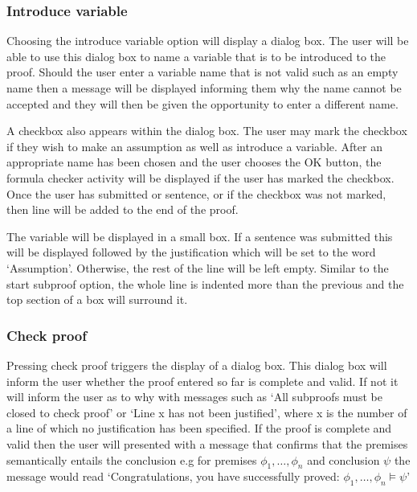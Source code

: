 \subsubsection*{Introduce variable}

Choosing the introduce variable option will display a dialog box. The user will be able to use this dialog box to name a variable that is to be introduced to the proof. Should the user enter a variable name that is not valid such as an empty name then a message will be displayed informing them why the name cannot be accepted and they will then be given the opportunity to enter a different name.


A checkbox also appears within the dialog box. The user may mark the checkbox if they wish to make an assumption as well as introduce a variable. After an appropriate name has been chosen and the user chooses the OK button, the formula checker activity will be displayed  if the user has marked the checkbox. Once the user has submitted or sentence, or if the checkbox was not marked, then line will be added to the end of the proof.

The variable will be displayed in a small box. If a sentence was submitted this will be displayed followed by the justification which will be set to the word `Assumption'. Otherwise, the rest of the line will be left empty. Similar to the start subproof option, the whole line is indented more than the previous and the top section of a box will surround it.


\subsubsection*{Check proof}

Pressing check proof triggers the display of a dialog box. This dialog box will inform the user whether the proof entered so far is complete and valid. If not it will inform the user as to why with messages such as `All subproofs must be closed to check proof' or `Line x has not been justified', where x is the number of a line of which no justification has been specified. If the proof is complete and valid then the user will presented with a message that confirms that the premises semantically entails the conclusion e.g for premises $\phi_1, \hdots , \phi_n$ and conclusion $\psi$ the message would read `Congratulations,  you have successfully proved: $\phi_1, \hdots , \phi_n \models \psi$'                                                                                                                                                                                  


